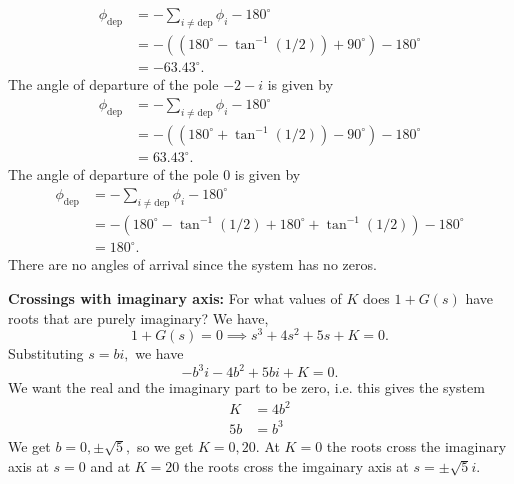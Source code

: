 \documentclass{article}
\begin{document}
\begin{enumerate}[label=\textbf{3.\arabic*}]
\begin{enumerate}[label=(\alph*)]
    \begin{align}
        \phi_\text{dep} &= -\sum_{i\neq \text{dep}} \phi_i - 180^\circ \\ 
        &= -\left((180^\circ-\tan^{-1}(1/2)) + 90^\circ\right)-180^\circ \\ 
        &= \boxed{-63.43^\circ}.
    \end{align}
    The angle of departure of the pole $-2-i$ is given by 
    \begin{align}
        \phi_\text{dep} &= -\sum_{i\neq \text{dep}} \phi_i - 180^\circ \\ 
        &= -\left((180^\circ+\tan^{-1}(1/2)) - 90^\circ\right)-180^\circ \\ 
        &= \boxed{63.43^\circ}.
    \end{align}
    The angle of departure of the pole $0$ is given by 
    \begin{align}
        \phi_\text{dep} &= -\sum_{i\neq \text{dep}} \phi_i - 180^\circ \\ 
        &= -(180^\circ - \tan^{-1}(1/2) + 180^\circ + \tan^{-1}(1/2))-180^\circ \\ 
        &= \boxed{180^\circ}.
    \end{align}
    There are no angles of arrival since the system has no zeros.

    \textbf{Crossings with imaginary axis:} For what values of $K$ does $1+G(s)$ have roots that are purely imaginary? We have,
    \begin{equation}
        1 + G(s) =0 \implies s^3+4s^2+5s+K=0.
    \end{equation}
    Substituting $s=bi,$ we have
    \begin{equation}
        -b^3i-4b^2+5bi+K=0.
    \end{equation}
    We want the real and the imaginary part to be zero, i.e. this gives the system 
    \begin{align}
        K&=4b^2 \\
        5b&=b^3 
    \end{align}
    We get $b=0,\pm\sqrt{5},$ so we get $K=0,20.$ At $K=0$ the roots cross the imaginary axis at $s=0$ and at $K=20$ the roots cross the imgainary axis at $\boxed{s=\pm \sqrt{5}i}.$


\end{enumerate}
\end{enumerate}
\end{document}
